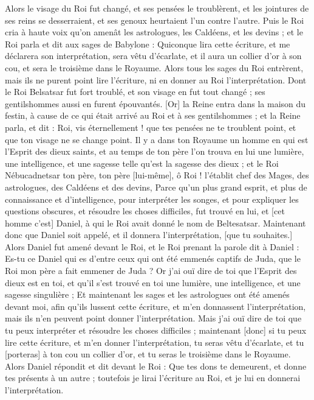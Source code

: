 \begin{multicols}{2}
Alors le visage du Roi fut changé, et ses pensées le troublèrent, et les jointures de ses reins se desserraient, et ses genoux heurtaient l'un contre l'autre.
Puis le Roi cria à haute voix qu'on amenât les astrologues, les Caldéens, et les devins ; et le Roi parla et dit aux sages de Babylone : Quiconque lira cette écriture, et me déclarera son interprétation, sera vêtu d'écarlate, et il aura un collier d'or à son cou, et sera le troisième dans le Royaume.
Alors tous les sages du Roi entrèrent, mais ils ne purent point lire l'écriture, ni en donner au Roi l'interprétation.
Dont le Roi Belsatsar fut fort troublé, et son visage en fut tout changé ; ses gentilshommes aussi en furent épouvantés.
[Or] la Reine entra dans la maison du festin, à cause de ce qui était arrivé au Roi et à ses gentilshommes ; et la Reine parla, et dit : Roi, vis éternellement ! que tes pensées ne te troublent point, et que ton visage ne se change point.
Il y a dans ton Royaume un homme en qui est l'Esprit des dieux saints, et au temps de ton père l'on trouva en lui une lumière, une intelligence, et une sagesse telle qu'est la sagesse des dieux ; et le Roi Nébucadnetsar ton père, ton père [lui-même], ô Roi ! l'établit chef des Mages, des astrologues, des Caldéens et des devins,
Parce qu'un plus grand esprit, et plus de connaissance et d'intelligence, pour interpréter les songes, et pour expliquer les questions obscures, et résoudre les choses difficiles, fut trouvé en lui, et [cet homme c'est] Daniel, à qui le Roi avait donné le nom de Beltesatsar. Maintenant donc que Daniel soit appelé, et il donnera l'interprétation, [que tu souhaites.]
Alors Daniel fut amené devant le Roi, et le Roi prenant la parole dit à Daniel : Es-tu ce Daniel qui es d'entre ceux qui ont été emmenés captifs de Juda, que le Roi mon père a fait emmener de Juda ?
Or j'ai ouï dire de toi que l'Esprit des dieux est en toi, et qu'il s'est trouvé en toi une lumière, une intelligence, et une sagesse singulière ;
Et maintenant les sages et les astrologues ont été amenés devant moi, afin qu'ils lussent cette écriture, et m'en donnassent l'interprétation, mais ils n'en peuvent point donner l'interprétation.
Mais j'ai ouï dire de toi que tu peux interpréter et résoudre les choses difficiles ; maintenant [donc] si tu peux lire cette écriture, et m'en donner l'interprétation, tu seras vêtu d'écarlate, et tu [porteras] à ton cou un collier d'or, et tu seras le troisième dans le Royaume.
Alors Daniel répondit et dit devant le Roi : Que tes dons te demeurent, et donne tes présents à un autre ; toutefois je lirai l'écriture au Roi, et je lui en donnerai l'interprétation.

\end{multicols}
